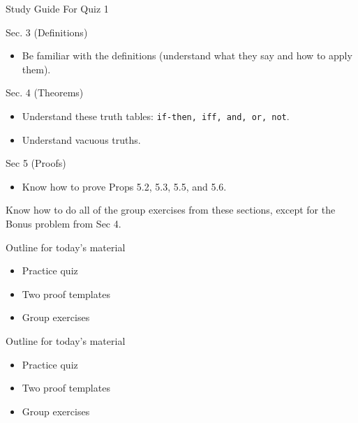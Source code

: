 \documentclass[10pt]{beamer}
\begin{document}
\begin{frame}{Study Guide For Quiz 1}


\begin{myredbox}[title=Readings (1 question)]
Sec. 3 (Definitions)
\begin{itemize}
\item Be familiar with the definitions (understand what they say and how to apply them).  
\end{itemize}
Sec. 4 (Theorems)
\begin{itemize}
\item Understand these truth tables: \texttt{if-then, iff, and, or, not}.
\item Understand vacuous truths.
\end{itemize}
Sec 5 (Proofs)
\begin{itemize}
\item Know how to prove Props 5.2, 5.3, 5.5, and 5.6.
\end{itemize}

\end{myredbox}

\vfill 

\begin{myyellowbox}[title=Group exercises (2 questions)]
Know how to do all of the group exercises from these sections, except for the Bonus problem from Sec 4.
\end{myyellowbox}


\end{frame}



\begin{frame}[standout]
Outline for today's material
\begin{itemize}
\item \textbullet \quad Practice quiz
\item \textbullet \quad Two proof templates
\item \textbullet \quad Group exercises
\end{itemize}

\end{frame}


\begin{frame}[standout]
Outline for today's material
\begin{itemize}
\item \textbullet \quad \alert{Practice quiz}
\item \textbullet \quad Two proof templates
\item \textbullet \quad Group exercises
\end{itemize}

\end{frame}
\end{document}
